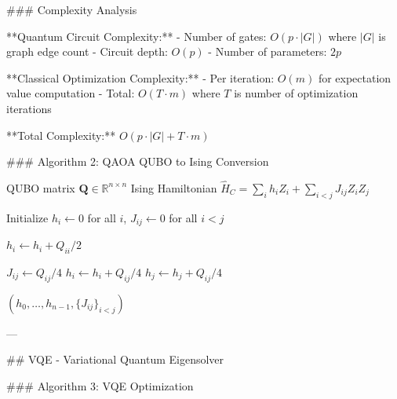 ### Complexity Analysis

**Quantum Circuit Complexity:**
- Number of gates: $O(p \cdot |G|)$ where $|G|$ is graph edge count
- Circuit depth: $O(p)$
- Number of parameters: $2p$

**Classical Optimization Complexity:**
- Per iteration: $O(m)$ for expectation value computation
- Total: $O(T \cdot m)$ where $T$ is number of optimization iterations

**Total Complexity:** $O(p \cdot |G| + T \cdot m)$

### Algorithm 2: QAOA QUBO to Ising Conversion

\begin{algorithm}
\caption{Convert QUBO to Ising Hamiltonian}
\begin{algorithmic}[1]
\REQUIRE QUBO matrix $\mathbf{Q} \in \mathbb{R}^{n \times n}$
\ENSURE Ising Hamiltonian $\hat{H}_C = \sum_i h_i Z_i + \sum_{i<j} J_{ij} Z_i Z_j$

\STATE Initialize $h_i \gets 0$ for all $i$, $J_{ij} \gets 0$ for all $i<j$

    \STATE $h_i \gets h_i + Q_{ii}/2$
\ENDFOR

        \STATE $J_{ij} \gets Q_{ij}/4$
        \STATE $h_i \gets h_i + Q_{ij}/4$
        \STATE $h_j \gets h_j + Q_{ij}/4$
    \ENDFOR
\ENDFOR

\RETURN $(h_0, \ldots, h_{n-1}, \{J_{ij}\}_{i<j})$
\end{algorithmic}
\end{algorithm}

---

## VQE - Variational Quantum Eigensolver

### Algorithm 3: VQE Optimization


